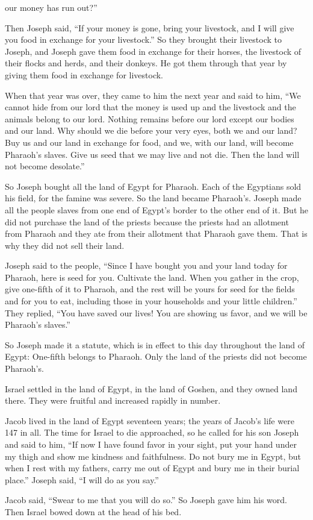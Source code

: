 {our money
has run out?”
\par }{\PP {}Then Joseph
said,
“If
your money
is gone,
bring
your livestock,
and I will give
you food in exchange for your livestock.”
So they brought
their livestock
to
Joseph,
and Joseph
gave them
food
in exchange for their horses,
the livestock
of their flocks
and herds,
and their donkeys.
He got them through
that year
by giving them
food
in exchange
for livestock.
\par }{\PP {}When that year
was over, they came
to him
the next
year
and said
to him, “We cannot
hide
from our lord
that
the money
is used up and the livestock
and the animals
belong to
our lord.
Nothing
remains
before
our lord
except
our bodies
and our land.
Why
should we die
before your very eyes,
both
we
and our land? Buy
us and our land
in exchange for food,
and we,
with our land,
will become
Pharaoh’s
slaves.
Give
us seed
that we may live
and not
die.
Then the land
will not
become desolate.”
\par }{\PP {}So Joseph
bought
all
the land
of Egypt
for
Pharaoh.
Each of the Egyptians
sold
his field,
for
the famine
was severe.
So
the land
became Pharaoh’s.
Joseph made all the people
slaves from one end
of Egypt’s
border
to the other
end of it.
But
he did not
purchase
the land
of the priests
because
the priests
had
an allotment
from Pharaoh
and they ate
from their allotment
that
Pharaoh
gave
them.
That is why
they did not
sell
their land.
\par }{\PP {}Joseph
said
to
the people,
“Since
I have bought
you and your land
today
for Pharaoh,
here is
seed
for you. Cultivate
the land.
When
you gather in the crop,
give
one-fifth
of it to Pharaoh,
and the rest
will be
yours for seed
for the fields
and for you to eat,
including those in your households
and your little children.”
They replied,
“You have saved our lives! You are showing
us favor,
and we will be
Pharaoh’s
slaves.”
\par }{\PP {}So
Joseph
made it
a statute,
which is in effect
to this
day
throughout the land
of Egypt: One-fifth
belongs to Pharaoh.
Only
the land
of the priests
did not
become
Pharaoh’s.
\par }{\PP {}Israel
settled
in the land
of Egypt,
in the land
of Goshen,
and they owned
land there. They were fruitful
and increased
rapidly
in number.
\par }{\PP {}Jacob
lived
in the land
of Egypt
seventeen
years;
the years
of Jacob’s
life
were 147 in all.
The time
for Israel
to die
approached,
so he called
for his son
Joseph
and said
to him, “If
now
I have found
favor
in your sight,
put
your
hand
under
my thigh
and show
me kindness
and faithfulness.
Do not
bury
me
in Egypt,
but when
I rest
with
my fathers,
carry
me out of Egypt
and bury
me in their burial
place.” Joseph said,
“I
will do
as
you say.”
\par }{\PP {}Jacob said,
“Swear
to me that you will do
so.” So Joseph gave him his word. Then Israel
bowed
down at the head
of his bed.

}
